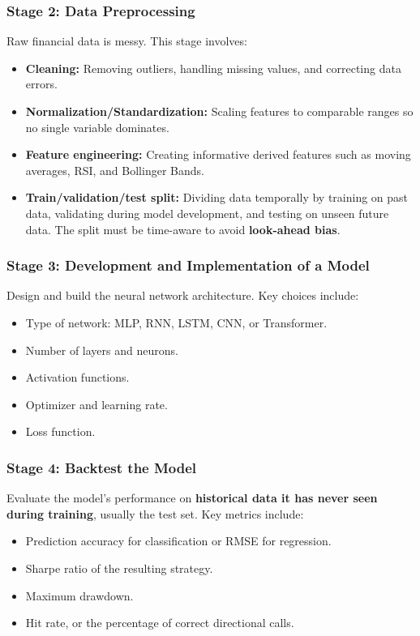 \documentclass[12pt,openany]{book}
\begin{document}
\subsubsection{Stage 2: Data Preprocessing}

Raw financial data is messy. This stage involves:
\begin{itemize}[leftmargin=*]
    \item \textbf{Cleaning:} Removing outliers, handling missing values, and correcting data errors.
    \item \textbf{Normalization/Standardization:} Scaling features to comparable ranges so no single variable dominates.
    \item \textbf{Feature engineering:} Creating informative derived features such as moving averages, RSI, and Bollinger Bands.
    \item \textbf{Train/validation/test split:} Dividing data temporally by training on past data, validating during model development, and testing on unseen future data. The split must be time-aware to avoid \textbf{look-ahead bias}.
\end{itemize}

\subsubsection{Stage 3: Development and Implementation of a Model}

Design and build the neural network architecture. Key choices include:
\begin{itemize}[leftmargin=*]
    \item Type of network: MLP, RNN, LSTM, CNN, or Transformer.
    \item Number of layers and neurons.
    \item Activation functions.
    \item Optimizer and learning rate.
    \item Loss function.
\end{itemize}

\subsubsection{Stage 4: Backtest the Model}

Evaluate the model's performance on \textbf{historical data it has never seen during training}, usually the test set. Key metrics include:
\begin{itemize}[leftmargin=*]
    \item Prediction accuracy for classification or RMSE for regression.
    \item Sharpe ratio of the resulting strategy.
    \item Maximum drawdown.
    \item Hit rate, or the percentage of correct directional calls.
\end{itemize}
\end{document}
